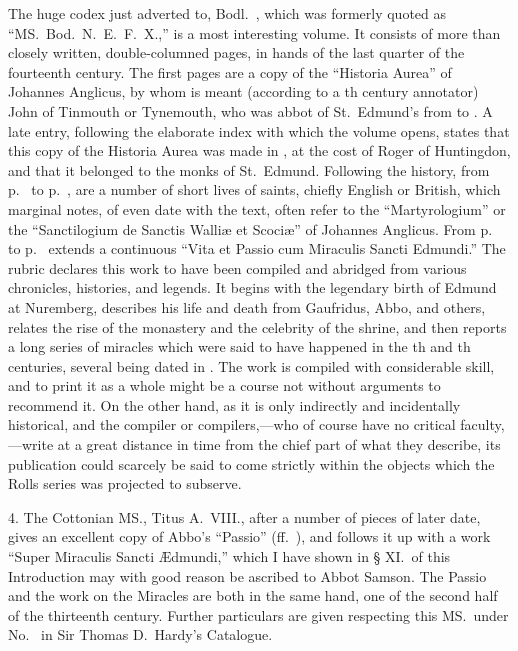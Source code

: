 \documentclass[10pt]{book}
\begin{document}
{The huge codex just adverted to, Bodl.\ , which was formerly quoted as ``MS.\ Bod.\ N.\ E.\ F.\ X.,'' is a most interesting volume. It consists of more than  closely written, double-columned pages, in hands of the last quarter of the fourteenth century. The first  pages are a copy of the ``Historia Aurea'' of Johannes Anglicus, by whom is meant (according to a th century annotator) John of Tinmouth or Tynemouth, who was abbot of St.\ Edmund's from  to . A late entry, following the elaborate index with which the volume opens, states that this copy of the Historia Aurea was made in , at the cost of Roger of Huntingdon, and that it belonged to the monks of St.\ Edmund. Following the history, from p.\  to p.\ , are a number of short lives of saints, chiefly English or British, which marginal notes, of even date with the text, often refer to the ``Martyrologium'' or the ``Sanctilogium de Sanctis Walli\ae{} et Scoci\ae{}'' of Johannes Anglicus. From p.\  to p.\  extends a continuous ``Vita et Passio cum Miraculis Sancti Edmundi.'' The rubric declares this work to have been compiled and abridged from various chronicles, histories, and legends. It begins with the legendary birth of Edmund at Nuremberg, describes his life and death from Gaufridus, Abbo, and others, relates the rise of the monastery and the celebrity of the shrine, and then reports a long series of miracles which were said to have happened in the th and th centuries, several being dated in . The work is compiled with considerable skill, and to print it as a whole might be a course not without arguments to recommend it. On the other hand, as it is only indirectly and incidentally historical, and the compiler or compilers,---who of course have no critical faculty,---write at a great distance in time from the chief part of what they describe, its publication could scarcely be said to come strictly within the objects which the Rolls series was projected to subserve.

4. The Cottonian MS., Titus A.\ VIII., after a number of pieces of later date, gives an excellent copy of Abbo's ``Passio'' (ff.\ ), and follows it up with a work ``Super Miraculis Sancti \AE{}dmundi,'' which I have shown in § XI.\ of this Introduction may with good reason be ascribed to Abbot Samson. The Passio and the work on the Miracles are both in the same hand, one of the second half of the thirteenth century. Further particulars are given respecting this MS.\ under No.\  in Sir Thomas D.\ Hardy's Catalogue.

}
\end{document}
